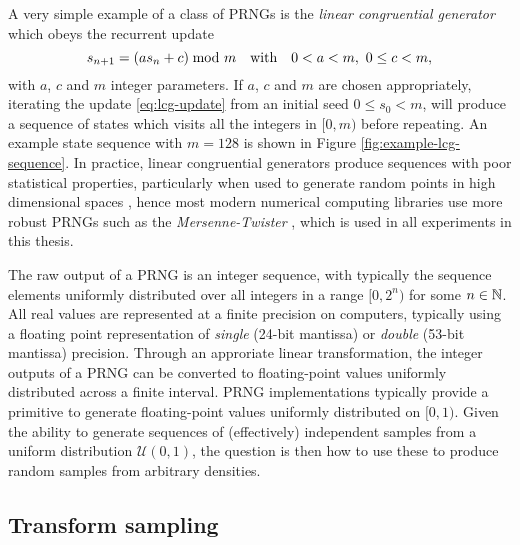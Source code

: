 A very simple example of a class of \acp{PRNG} is the \emph{linear congruential generator} \citep{lehmer1951mathematical} which obeys the recurrent update
\begin{equation}\label{eq:lcg-update}
  s_{n+1} = (a s_n + c) \kern-4pt\mod m
  \quad \textrm{with} \quad
   0 < a < m,~ 0 \leq c < m,
\end{equation}
with $a$, $c$ and $m$ integer parameters. If $a$, $c$ and $m$ are chosen appropriately, iterating the update \eqref{eq:lcg-update} from an initial seed $0 \leq s_0 < m$, will produce a sequence of states which visits all the integers in $[0, m)$ before repeating. An example state sequence with $m=128$ is shown in Figure \ref{fig:example-lcg-sequence}. In practice, linear congruential generators produce sequences with poor statistical properties, particularly when used to generate random points in high dimensional spaces \citep{marsaglia1968random}, hence most modern numerical computing libraries use more robust \acp{PRNG} such as the \emph{Mersenne-Twister} \citep{matsumoto1998mersenne}, which is used in all experiments in this thesis.

The raw output of a \ac{PRNG} is an integer sequence, with typically the sequence elements uniformly distributed over all integers in a range $[0, 2^n)$ for some $n \in \mathbb{N}$. All real values are represented at a finite precision on computers, typically using a floating point representation \citep{ieee2008standard} of \emph{single} (24-bit mantissa) or \emph{double} (53-bit mantissa) precision. Through an approriate linear transformation, the integer outputs of a \ac{PRNG} can be converted to floating-point values uniformly distributed across a finite interval. \ac{PRNG} implementations typically provide a primitive to generate floating-point values uniformly distributed on $[0, 1)$. Given the ability to generate sequences of (effectively) independent samples from a uniform distribution $\mathcal{U}(0,1)$, the question is then how to use these to produce random samples from arbitrary densities. %

\subsection{Transform sampling}

